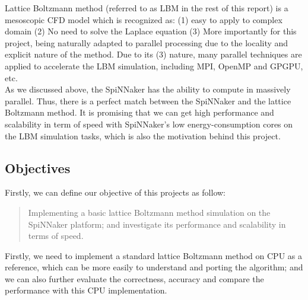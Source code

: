 Lattice Boltzmann method (referred to as LBM in the rest of this report) is a mesoscopic CFD model which is recognized\cite{lbmmbook} as: (1) easy to apply to complex domain (2) No need to solve the Laplace equation (3) More importantly for this project, being naturally adapted to parallel processing due to the locality and explicit nature of the method. Due to its (3) nature, many parallel techniques are applied to accelerate the LBM simulation, including MPI\cite{he1999three}, OpenMP\cite{massaioli2002achieving} and GPGPU\cite{rogers1990upwind}, etc. \\

As we discussed above, the SpiNNaker has the ability to compute in massively parallel. Thus, there is a perfect match between the SpiNNaker and the lattice Boltzmann method. It is promising that we can get high performance and scalability in term of speed with SpiNNaker's low energy-consumption cores on the LBM simulation tasks, which is also the motivation behind this project.  \\




\subsection{Objectives} \label{sec:Obj}

Firstly, we can define our objective of this projects as follow:\\

\begin{quote}
Implementing a basic lattice Boltzmann method simulation on the SpiNNaker platform; and investigate its  performance and scalability in terms of speed. \\
\end{quote}



Firstly, we need to implement a standard lattice Boltzmann method on CPU as a reference, which can be more easily to understand and porting the algorithm; and we can also further evaluate the correctness, accuracy and compare the performance with this CPU implementation.\\

